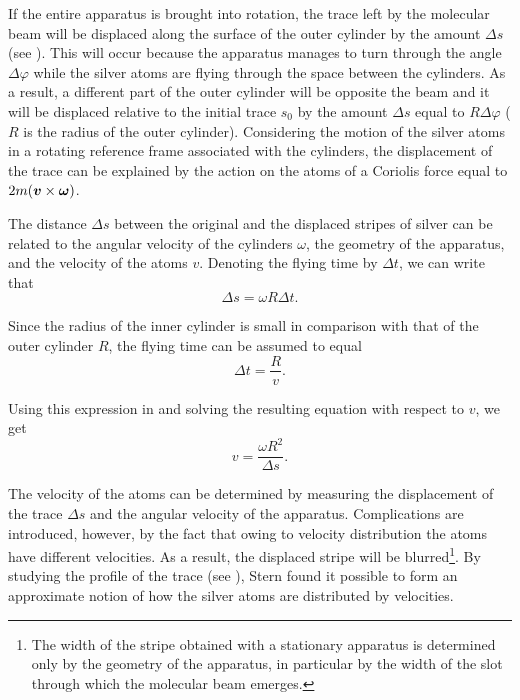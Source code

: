 If the entire apparatus is brought into rotation, the trace left by the molecular beam will be displaced along the surface of the outer cylinder by the amount $\Delta s$ (see ). This will occur because the apparatus manages to turn through the angle $\Delta\varphi$ while the silver atoms are flying through the space between the cylinders. As a result, a different part of the outer cylinder will be opposite the beam and it will be displaced relative to the initial trace $s_0$ by the amount $\Delta s$ equal to $R\Delta\varphi$ ($R$ is the radius of the outer cylinder). Considering the motion of the silver atoms in a rotating reference frame associated with the cylinders, the displacement of the trace can be explained by the action on the atoms of a Coriolis force equal to $2m(\boldsymbol{v}\times\boldsymbol{\omega})$.

The distance $\Delta s$ between the original and the displaced stripes of silver can be related to the angular velocity of the cylinders $\omega$, the geometry of the apparatus, and the velocity of the atoms $v$. Denoting the flying time by $\Delta t$, we can write that
\begin{equation}\label{eq:11_74}
	\Delta s = \omega R\Delta t.
\end{equation}

\noindent
Since the radius of the inner cylinder is small in comparison with that of the outer cylinder $R$, the flying time can be assumed to equal
\begin{equation*}
	\Delta t = \frac{R}{v}.
\end{equation*}

\noindent
Using this expression in  and solving the resulting equation with respect to $v$, we get
\begin{equation*}
	v = \frac{\omega R^2}{\Delta s}.
\end{equation*}

The velocity of the atoms can be determined by measuring the displacement of the trace $\Delta s$ and the angular velocity of the apparatus. Complications are introduced, however, by the fact that owing to velocity distribution the atoms have different velocities. As a result, the displaced stripe will be blurred\footnote{The width of the stripe obtained with a stationary apparatus is determined only by the geometry of the apparatus, in particular by the	width of the slot through which the molecular beam emerges.}. By studying the profile of the trace (see ), Stern found it possible to form an approximate notion of how the silver atoms are distributed by velocities.

